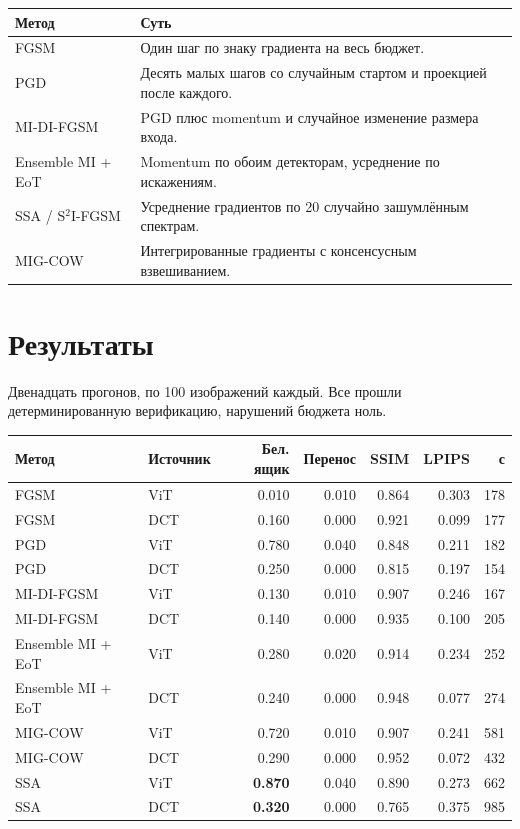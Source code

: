 \documentclass[11pt,a4paper]{article}
\begin{document}
\begin{longtable}{@{}lp{11.2cm}@{}}
\toprule
\textbf{Метод} & \textbf{Суть} \\
\midrule
\endhead
FGSM & Один шаг по знаку градиента на весь бюджет. \\
PGD & Десять малых шагов со случайным стартом и проекцией после каждого. \\
MI-DI-FGSM & PGD плюс momentum и случайное изменение размера входа. \\
Ensemble MI + EoT & Momentum по обоим детекторам, усреднение по искажениям. \\
SSA / S$^2$I-FGSM & Усреднение градиентов по 20 случайно зашумлённым спектрам. \\
MIG-COW & Интегрированные градиенты с консенсусным взвешиванием. \\
\bottomrule
\end{longtable}

\section{Результаты}

Двенадцать прогонов, по 100 изображений каждый. Все прошли детерминированную
верификацию, нарушений бюджета ноль.

\begin{longtable}{@{}llrrrrr@{}}
\toprule
\textbf{Метод} & \textbf{Источник} & \textbf{Бел. ящик} & \textbf{Перенос} &
\textbf{SSIM} & \textbf{LPIPS} & \textbf{с} \\
\midrule
\endhead
FGSM              & ViT & 0.010 & 0.010 & 0.864 & 0.303 & 178 \\
FGSM              & DCT & 0.160 & 0.000 & 0.921 & 0.099 & 177 \\
PGD               & ViT & 0.780 & 0.040 & 0.848 & 0.211 & 182 \\
PGD               & DCT & 0.250 & 0.000 & 0.815 & 0.197 & 154 \\
MI-DI-FGSM        & ViT & 0.130 & 0.010 & 0.907 & 0.246 & 167 \\
MI-DI-FGSM        & DCT & 0.140 & 0.000 & 0.935 & 0.100 & 205 \\
Ensemble MI + EoT & ViT & 0.280 & 0.020 & 0.914 & 0.234 & 252 \\
Ensemble MI + EoT & DCT & 0.240 & 0.000 & 0.948 & 0.077 & 274 \\
MIG-COW           & ViT & 0.720 & 0.010 & 0.907 & 0.241 & 581 \\
MIG-COW           & DCT & 0.290 & 0.000 & 0.952 & 0.072 & 432 \\
SSA               & ViT & \textbf{0.870} & 0.040 & 0.890 & 0.273 & 662 \\
SSA               & DCT & \textbf{0.320} & 0.000 & 0.765 & 0.375 & 985 \\
\bottomrule
\end{longtable}
\end{document}
